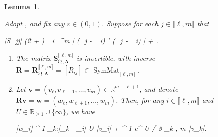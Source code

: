 \documentclass{amsart}
\numberwithin{equation}{section}
\DeclareMathOperator{\SymMat}{SymMat}
\newtheorem{lem}[thm]{Lemma}
\theoremstyle{remark}
\theoremstyle{definition}
\begin{document}
	\begin{lem} 
		
		\label{sk1k2inverse} 
		
		Adopt , and fix any $\varepsilon \in (0, 1)$. Suppose for each $j \in \llbracket \ell, m \rrbracket$ that
		\begin{flalign}
			\label{sumchi} 
			|S_{jj}| \ge (2 + \varepsilon) \displaystyle\sum_{i=\ell}^{m} |  (\Lambda_j - \Lambda_i) \cdot \chi' (\mathfrak{Q}_j - _i) | +  \varepsilon.
		\end{flalign}
		
		\begin{enumerate} 
			\item The matrix $\bm{S}_{\bm{\mathfrak{Q}};\bm{\Lambda}}^{\llbracket \ell, m \rrbracket}$ is invertible, with inverse $\bm{R} = \bm{R}_{\bm{\mathfrak{Q}}; \bm{\Lambda}}^{\llbracket \ell, m \rrbracket} = [R_{ij}] \in \SymMat_{\llbracket \ell, m \rrbracket}$.
			\item Let $\bm{v} = (v_{\ell}, v_{\ell+1}, \ldots , v_{m}) \in \mathbb{R}^{m-\ell+1}$, and denote $\bm{R} \bm{v} = \bm{w} = (w_{\ell}, w_{\ell+1}, \ldots , w_{m})$. Then, for any $i \in \llbracket \ell, m \rrbracket$ and $U \in \mathbb{R}_{\ge 1} \cup \{ \infty \}$, we have 
			\begin{flalign}
				\label{wivi} 
				|w_i| \le \varepsilon^{-1} \cdot \displaystyle\max_{k:|\mathfrak{Q}_k - _i| \le U } |v_i| + \varepsilon^{-1}  e^{-\varepsilon U / 8} \cdot \displaystyle\max_{k \in \llbracket \ell, m \rrbracket} |v_k|.
			\end{flalign} 
			
		\end{enumerate} 
		
	\end{lem} 
	
\end{document}
